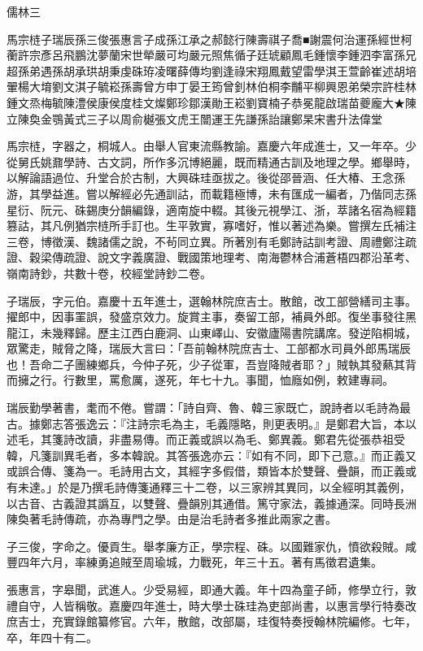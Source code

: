 
\begin{pinyinscope}
儒林三

馬宗梿子瑞辰孫三俊張惠言子成孫江承之郝懿行陳壽祺子喬■謝震何治運孫經世柯蘅許宗彥呂飛鵬沈夢蘭宋世犖嚴可均嚴元照焦循子廷琥顧鳳毛鍾懷李鍾泗李富孫兄超孫弟遇孫胡承珙胡秉虔硃珔凌曙薛傳均劉逢祿宋翔鳳戴望雷學淇王萱齡崔述胡培翬楊大堉劉文淇子毓崧孫壽曾方申丁晏王筠曾釗林伯桐李黼平柳興恩弟榮宗許桂林鍾文烝梅毓陳澧侯康侯度桂文燦鄭珍鄒漢勛王崧劉寶楠子恭冕龍啟瑞苗夔龐大★陳立陳奐金鶚黃式三子以周俞樾張文虎王闓運王先謙孫詒讓鄭杲宋書升法偉堂

馬宗梿，字器之，桐城人。由舉人官東流縣教諭。嘉慶六年成進士，又一年卒。少從舅氏姚鼐學詩、古文詞，所作多沉博絕麗，既而精通古訓及地理之學。鄉舉時，以解論語過位、升堂合於古制，大興硃珪亟拔之。後從邵晉涵、任大椿、王念孫游，其學益進。嘗以解經必先通訓詁，而載籍極博，未有匯成一編者，乃偕同志孫星衍、阮元、硃錫庚分韻編錄，適南旋中輟。其後元視學江、浙，萃諸名宿為經籍篡詁，其凡例猶宗梿所手訂也。生平敦實，寡嗜好，惟以著述為樂。嘗撰左氏補注三卷，博徵漢、魏諸儒之說，不茍同立異。所著別有毛鄭詩詁訓考證、周禮鄭注疏證、穀梁傳疏證、說文字義廣證、戰國策地理考、南海鬱林合浦蒼梧四郡沿革考、嶺南詩鈔，共數十卷，校經堂詩鈔二卷。

子瑞辰，字元伯。嘉慶十五年進士，選翰林院庶吉士。散館，改工部營繕司主事。擢郎中，因事罣誤，發盛京效力。旋賞主事，奏留工部，補員外郎。復坐事發往黑龍江，未幾釋歸。歷主江西白鹿洞、山東嶧山、安徽廬陽書院講席。發逆陷桐城，眾驚走，賊脅之降，瑞辰大言曰：「吾前翰林院庶吉士、工部都水司員外郎馬瑞辰也！吾命二子團練鄉兵，今仲子死，少子從軍，吾豈降賊者耶？」賊執其發爇其背而擁之行。行數里，罵愈厲，遂死，年七十九。事聞，恤廕如例，敕建專祠。

瑞辰勤學著書，耄而不倦。嘗謂：「詩自齊、魯、韓三家既亡，說詩者以毛詩為最古。據鄭志答張逸云：『注詩宗毛為主，毛義隱略，則更表明。』是鄭君大旨，本以述毛，其箋詩改讀，非盡易傳。而正義或誤以為毛、鄭異義。鄭君先從張恭祖受韓，凡箋訓異毛者，多本韓說。其答張逸亦云：『如有不同，即下己意。』而正義又或誤合傳、箋為一。毛詩用古文，其經字多假借，類皆本於雙聲、疊韻，而正義或有未達。」於是乃撰毛詩傳箋通釋三十二卷，以三家辨其異同，以全經明其義例，以古音、古義證其譌互，以雙聲、疊韻別其通借。篤守家法，義據通深。同時長洲陳奐著毛詩傳疏，亦為專門之學。由是治毛詩者多推此兩家之書。

子三俊，字命之。優貢生。舉孝廉方正，學宗程、硃。以國難家仇，憤欲殺賊。咸豐四年六月，率練勇追賊至周瑜城，力戰死，年三十五。著有馬徵君遺集。

張惠言，字皋聞，武進人。少受易經，即通大義。年十四為童子師，修學立行，敦禮自守，人皆稱敬。嘉慶四年進士，時大學士硃珪為吏部尚書，以惠言學行特奏改庶吉士，充實錄館纂修官。六年，散館，改部屬，珪復特奏授翰林院編修。七年，卒，年四十有二。


\end{pinyinscope}
